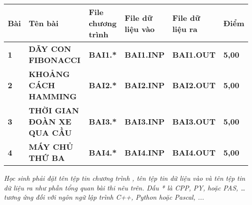 \documentclass[
]{article}
\begin{document}
\begin{longtable}[]{@{}
  >{\centering\arraybackslash}p{}
  >{\raggedright\arraybackslash}p{}
  >{\centering\arraybackslash}p{}
  >{\centering\arraybackslash}p{}
  >{\centering\arraybackslash}p{}
  >{\centering\arraybackslash}p{}@{}}
\toprule\noalign{}
\begin{minipage}[b]{\linewidth}\centering
\textbf{Bài}
\end{minipage} & \begin{minipage}[b]{\linewidth}\centering
\textbf{Tên bài}
\end{minipage} & \begin{minipage}[b]{\linewidth}\centering
\textbf{File chương trình}
\end{minipage} & \begin{minipage}[b]{\linewidth}\centering
\textbf{File dữ liệu vào}
\end{minipage} & \begin{minipage}[b]{\linewidth}\centering
\textbf{File dữ liệu ra}
\end{minipage} & \begin{minipage}[b]{\linewidth}\centering
\textbf{Điểm}
\end{minipage} \\
\midrule\noalign{}
\endhead
\bottomrule\noalign{}
\endlastfoot
\textbf{1} & \textbf{DÃY CON FIBONACCI} & \textbf{BAI1.*} &
\textbf{BAI1.INP} & \textbf{BAI1.OUT} & \textbf{5,00} \\
\textbf{2} & \textbf{KHOẢNG CÁCH HAMMING} & \textbf{BAI2.*} &
\textbf{BAI2.INP} & \textbf{BAI2.OUT} & \textbf{5,00} \\
\textbf{3} & \textbf{THỜI GIAN ĐOÀN XE QUA CẦU} & \textbf{BAI3.*} &
\textbf{BAI3.INP} & \textbf{BAI3.OUT} & \textbf{5,00} \\
\textbf{4} & \textbf{MÁY CHỦ THỨ BA} & \textbf{BAI4.*} &
\textbf{BAI4.INP} & \textbf{BAI4.OUT} & \textbf{5,00} \\
\end{longtable}

\it{Học sinh phải đặt tên tệp tin chương trình , tên tệp tin dữ liệu
vào và tên tệp tin dữ liệu ra như phần tổng quan bài thi nêu trên. Dấu *
là CPP, PY, hoặc PAS, \ldots{} tương ứng đối với ngôn ngữ lập trình C++,
Python hoặc Pascal, ...}
\end{document}
